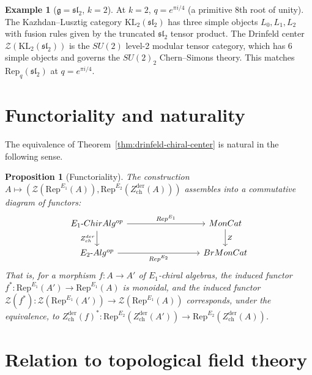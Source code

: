 \documentclass[11pt]{article}
\newtheorem{proposition}[theorem]{Proposition}
\theoremstyle{definition}
\newtheorem{example}[theorem]{Example}
\theoremstyle{remark}
\newcommand{\Rep}{\mathrm{Rep}}
\newcommand{\cZ}{\mathcal{Z}}
\newcommand{\frakg}{\mathfrak{g}}
\newcommand{\KL}{\mathrm{KL}}
\newcommand{\Zder}{Z^{\mathrm{der}}_{\mathrm{ch}}}
\begin{document}
\begin{example}[$\frakg = \mathfrak{sl}_2$, $k = 2$]
\label{ex:sl2-level2}
At $k = 2$, $q = e^{\pi i / 4}$ (a primitive 8th root of unity). The Kazhdan--Lusztig category $\KL_2(\mathfrak{sl}_2)$ has three simple objects $L_0, L_1, L_2$ with fusion rules given by the truncated $\mathfrak{sl}_2$ tensor product. The Drinfeld center $\cZ(\KL_2(\mathfrak{sl}_2))$ is the $SU(2)$ level-2 modular tensor category, which has 6 simple objects and governs the $SU(2)_2$ Chern--Simons theory. This matches $\Rep_q(\mathfrak{sl}_2)$ at $q = e^{\pi i/4}$.
\end{example}


\section{Functoriality and naturality}
\label{sec:functoriality}

The equivalence of Theorem~\ref{thm:drinfeld-chiral-center} is natural in the following sense.

\begin{proposition}[Functoriality]
\label{prop:functoriality}
The construction $A \mapsto (\cZ(\Rep^{E_1}(A)), \Rep^{E_2}(\Zder(A)))$ assembles into a commutative diagram of functors:
\[
\begin{tikzcd}[column sep=3cm]
 E_1\text{-}\mathrm{ChirAlg}^{\mathrm{op}} \ar[r, "\Rep^{E_1}"] \ar[d, "\Zder"'] &
 \mathrm{MonCat} \ar[d, "\cZ"] \\
 E_2\text{-}\mathrm{Alg}^{\mathrm{op}} \ar[r, "\Rep^{E_2}"'] &
 \mathrm{BrMonCat}
\end{tikzcd}
\]
That is, for a morphism $f \colon A \to A'$ of $E_1$-chiral algebras, the induced functor $f^* \colon \Rep^{E_1}(A') \to \Rep^{E_1}(A)$ is monoidal, and the induced functor $\cZ(f^*) \colon \cZ(\Rep^{E_1}(A')) \to \cZ(\Rep^{E_1}(A))$ corresponds, under the equivalence, to $\Zder(f)^* \colon \Rep^{E_2}(\Zder(A')) \to \Rep^{E_2}(\Zder(A))$.
\end{proposition}


\section{Relation to topological field theory}
\label{sec:tft}
\end{document}

